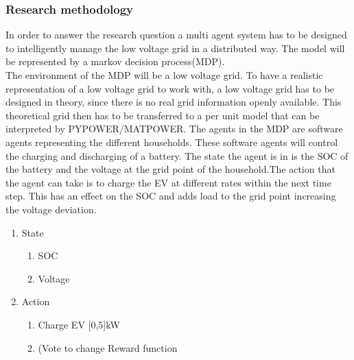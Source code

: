\documentclass[a4paper]{article}
\begin{document}
\subsubsection{Research methodology}
In order to answer the research question a multi agent system has to be designed to intelligently manage the low voltage grid in a distributed way. 
The model will be represented by a markov decision process(MDP).\\
The environment of the MDP will be a low voltage grid. To have a realistic representation of a low voltage grid to work with, a low voltage grid has to be designed in theory, since there is no real grid information openly available. This theoretical grid then has to be transferred to a per unit model that can be interpreted by PYPOWER/MATPOWER. The agents in the MDP are software agents representing the different households. These software agents will control the charging and discharging of a battery. 
The state the agent is in is the SOC of the battery and the voltage at the grid point of the household.The action that the agent can take is to charge the EV at different rates within the next time step. This has an effect on the SOC and adds load to the grid point increasing the voltage deviation.  \\

\begin{enumerate}
\item State\begin{enumerate}
\item SOC
\item Voltage
\end{enumerate}
\item Action\begin{enumerate}
\item Charge EV [0,5]kW
\item (Vote to change Reward function
\end{enumerate}

\end{enumerate}
\end{document}
